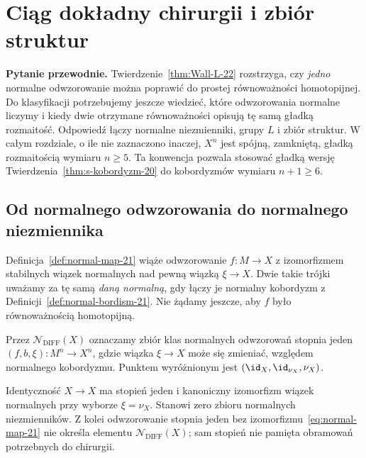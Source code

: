 \chapter{Ciąg dokładny chirurgii i zbiór struktur}
\label{ch:ciag-chirurgii}

\noindent\textbf{Pytanie przewodnie.}
Twierdzenie~\ref{thm:Wall-L-22} rozstrzyga, czy
\emph{jedno} normalne odwzorowanie można poprawić
do prostej równoważności homotopijnej.
Do klasyfikacji potrzebujemy jeszcze wiedzieć,
które odwzorowania normalne liczymy i kiedy
dwie otrzymane równoważności opisują tę samą
gładką rozmaitość. Odpowiedź łączy normalne
niezmienniki, grupy $L$ i zbiór struktur.
W całym rozdziale, o ile nie zaznaczono inaczej,
$X^n$ jest spójną, zamkniętą, gładką
rozmaitością wymiaru $n\geq5$.
Ta konwencja pozwala stosować gładką
wersję Twierdzenia~\ref{thm:s-kobordyzm-20}
do kobordyzmów wymiaru $n+1\geq6$.

\section{Od normalnego odwzorowania do normalnego niezmiennika}
\label{sec:normalne-niezmienniki-23}

Definicja~\ref{def:normal-map-21} wiąże
odwzorowanie $f:M\to X$ z izomorfizmem
stabilnych wiązek normalnych nad pewną
wiązką $\xi\to X$. Dwie takie trójki
uważamy za tę samą \emph{daną normalną},
gdy łączy je normalny kobordyzm z
Definicji~\ref{def:normal-bordism-21}.
Nie żądamy jeszcze, aby $f$ było
równoważnością homotopijną.

\begin{definicja}
\label{def:normal-invariants-23}
Przez $\mathcal N_{\mathrm{DIFF}}(X)$ oznaczamy
zbiór klas normalnych odwzorowań stopnia jeden
$(f,b,\xi):M^n\to X^n$, gdzie wiązka
$\xi\to X$ może się zmieniać, względem normalnego
kobordyzmu. Punktem wyróżnionym jest
$(\id_X,\id_{\nu_X},\nu_X)$.
\end{definicja}

\begin{przyklad}[Identyczność]
\label{prz:normalny-punkt-23}
Identyczność $X\to X$ ma stopień jeden i
kanoniczny izomorfizm wiązek normalnych
przy wyborze $\xi=\nu_X$.
Stanowi zero zbioru normalnych niezmienników.
Z kolei odwzorowanie stopnia jeden bez
izomorfizmu~\eqref{eq:normal-map-21}
nie określa elementu $\mathcal N_{\mathrm{DIFF}}(X)$;
sam stopień nie pamięta obramowań
potrzebnych do chirurgii.
\end{przyklad}

